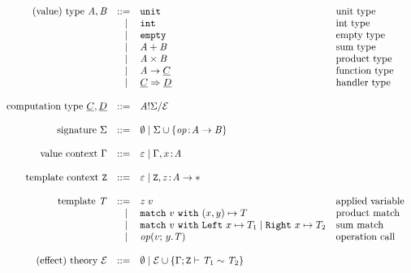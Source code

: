 
\[
	\begin{array}{rrll}
		\text{(value) type}~\tyA, \tyB
		 & ::=   & \unittype          				& \text{unit type}			\\
		 & \vsep & \inttype         					& \text{int type}				\\
		 & \vsep & \emptytype         				& \text{empty type}			\\
		 & \vsep & \sumtype{\tyA}{\tyB}   		& \text{sum type}				\\
		 & \vsep & \producttype{\tyA}{\tyB}   & \text{product type}		\\
		 & \vsep & \tyA \to \ctyC     				& \text{function type}	\\
		 & \vsep & \ctyC \hto \ctyD   				& \text{handler type}		\\
		\\
		\text{computation type}~\ctyC, \ctyD
		 & ::=   & \ctype{\tyA}{\sig}{\eqE} \\
		\\
		\text{signature}~\sig
		 & ::=   & \nil \vsep \sig \union \set{{\op \oftype \tyA \to \tyB}} \\
		\\
		\text{value context}~\ctx
		 & ::=   & \varepsilon \vsep \ctx, x \oftype \tyA \\
		\\
		\text{template context}~\tvars
		 & ::=   & \varepsilon \vsep \tvars, z \oftype \tyA \to \anytype \\
		\\
		\text{template}~\tmplT
		 & ::=   & \apply{z}{v} & \text{applied variable} 											\\
		 & \vsep & \match{v} \pair{x}{y} \mapsto T & \text{product match} 			\\
		 & \vsep & \match{v} 	\sumcases{x}{T_1}{x}{T_2}  & \text{sum match}			\\
		 & \vsep & \operation{v}{y.\tmplT} & \text{operation call} 							\\
		\\
		\text{(effect) theory}~\eqE
		 & ::=   & \nil \vsep \eqE \union
							 \set{\teqjudgement{\tenv}{\tmplT_1 \rel \tmplT_2}} \\
	\end{array}
\]
